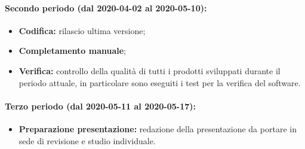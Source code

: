 				\paragraph{Secondo periodo (dal 2020-04-02 al 2020-05-10):}
				
					\begin{itemize}
						\item \textbf{Codifica:} rilascio ultima versione;
						\item \textbf{Completamento manuale};
						\item \textbf{Verifica:} controllo della qualità di tutti i prodotti sviluppati durante il periodo attuale, in particolare sono eseguiti i test per la verifica del software.
					\end{itemize}
		
				\paragraph{Terzo periodo (dal 2020-05-11 al 2020-05-17):}
				
					\begin{itemize}
						\item \textbf{Preparazione presentazione:} redazione della presentazione da portare in sede di revisione e studio individuale.
					\end{itemize}
	
